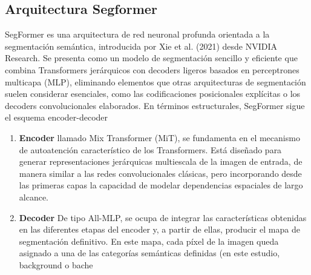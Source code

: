 \subsection{Arquitectura Segformer}
SegFormer es una arquitectura de red neuronal profunda orientada a la segmentación semántica, introducida por Xie et al. (2021) desde NVIDIA Research. Se presenta como un modelo de segmentación sencillo y eficiente que combina Transformers jerárquicos con decoders ligeros basados en perceptrones multicapa (MLP), eliminando elementos que otras arquitecturas de segmentación suelen considerar esenciales, como las codificaciones posicionales explícitas o los decoders convolucionales elaborados.
En términos estructurales, SegFormer sigue el esquema encoder-decoder
\begin{enumerate}
	\item \textbf{Encoder} llamado Mix Transformer (MiT), se fundamenta en el mecanismo de autoatención característico de los Transformers. Está diseñado para generar representaciones jerárquicas multiescala de la imagen de entrada, de manera similar a las redes convolucionales clásicas, pero incorporando desde las primeras capas la capacidad de modelar dependencias espaciales de largo alcance.
	\item \textbf{Decoder} De tipo All-MLP, se ocupa de integrar las características obtenidas en las diferentes etapas del encoder y, a partir de ellas, producir el mapa de segmentación definitivo. En este mapa, cada píxel de la imagen queda asignado a una de las categorías semánticas definidas (en este estudio, background o bache
\end{enumerate}

